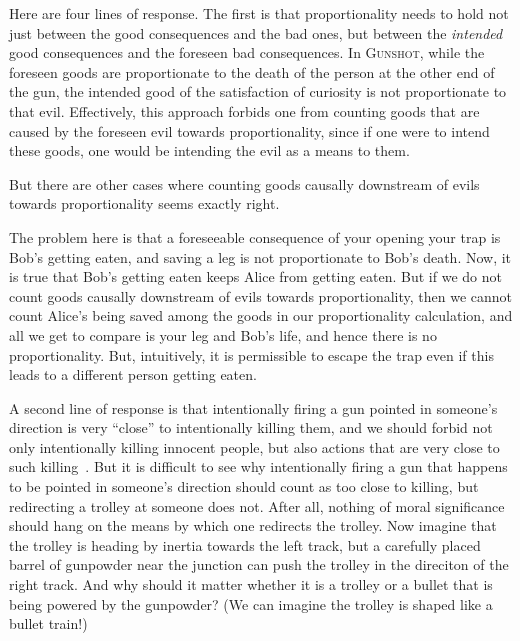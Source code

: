 Here are four lines of response. The first is that proportionality needs to hold not just between the good consequences and
the bad ones, but between the \textit{intended} good consequences and the foreseen bad consequences. In \textsc{Gunshot},
while the foreseen goods are proportionate to the death of the person at the other end of the gun, the intended good
of the satisfaction of curiosity is not proportionate to that evil. Effectively, this approach forbids one from counting
goods that are caused by the foreseen evil towards proportionality, since if one were to intend these goods, one would be
intending the evil as a means to them.

But there are other cases where counting goods causally downstream of evils towards proportionality seems exactly right. 

The problem here is that a foreseeable consequence of your opening your trap is Bob's getting eaten, and saving a leg is not
proportionate to Bob's death. Now, it is true that Bob's getting eaten keeps Alice from getting eaten. But if we do not count
goods causally downstream of evils towards proportionality, then we cannot count Alice's being saved among the goods in 
our proportionality calculation, and all we get to compare is your leg and Bob's life, and hence there is no proportionality.
But, intuitively, it is permissible to escape the trap even if this leads to a different person getting eaten.

A second line of response is that intentionally firing a gun pointed in someone's direction is very ``close'' to intentionally
killing them, and we should forbid not only intentionally killing innocent people, but also actions that are very close to such
killing~\parencite{FootAbortion,DelaneyCloseness}. But it is difficult to see why intentionally firing a gun that happens to be pointed in someone's direction should 
count as too close to killing, but redirecting a trolley at someone does not. After all, nothing of moral significance should
hang on the means by which one redirects the trolley. Now imagine that the trolley is heading by inertia towards the left 
track, but a carefully placed barrel of gunpowder near the junction can push the trolley in the direciton of the right track.
And why should it matter whether it is a trolley or a bullet that is being powered by the gunpowder? (We can imagine the
trolley is shaped like a bullet train!) 


